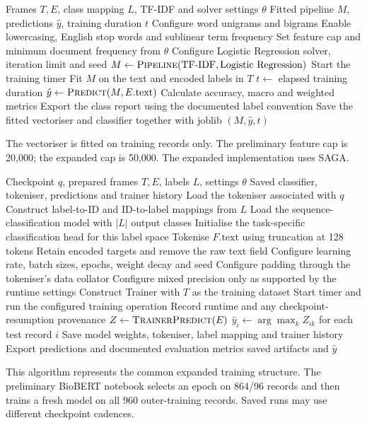 \documentclass[11pt,a4paper]{article}
\begin{document}
\newpage
\begin{algorithm}[H]
\caption{Train and evaluate TF-IDF with Logistic Regression}
\label{alg:tfidf}
\begin{algorithmic}[1]
\Require Frames $T,E$, class mapping $L$, TF-IDF and solver settings $\theta$
\Ensure Fitted pipeline $M$, predictions $\hat y$, training duration $t$
\State Configure word unigrams and bigrams
\State Enable lowercasing, English stop words and sublinear term frequency
\State Set feature cap and minimum document frequency from $\theta$
\State Configure Logistic Regression solver, iteration limit and seed
\State $M\gets\Call{Pipeline}{\text{TF-IDF},\text{Logistic Regression}}$
\State Start the training timer
\State Fit $M$ on the text and encoded labels in $T$
\State $t\gets$ elapsed training duration
\State $\hat y\gets\Call{Predict}{M,E.\text{text}}$
\State Calculate accuracy, macro and weighted metrics
\State Export the class report using the documented label convention
\State Save the fitted vectoriser and classifier together with joblib
\State \Return $(M,\hat y,t)$
\end{algorithmic}
\end{algorithm}
The vectoriser is fitted on training records only. The preliminary feature cap
is 20,000; the expanded cap is 50,000. The expanded implementation uses SAGA.

\newpage
\begin{algorithm}[H]
\caption{Fine-tune an expanded-dataset transformer classifier}
\label{alg:transformer}
\begin{algorithmic}[1]
\Require Checkpoint $q$, prepared frames $T,E$, labels $L$, settings $\theta$
\Ensure Saved classifier, tokeniser, predictions and trainer history
\State Load the tokeniser associated with $q$
\State Construct label-to-ID and ID-to-label mappings from $L$
\State Load the sequence-classification model with $|L|$ output classes
\State Initialise the task-specific classification head for this label space
  \State Tokenise $F.\text{text}$ using truncation at 128 tokens
  \State Retain encoded targets and remove the raw text field
\EndFor
\State Configure learning rate, batch sizes, epochs, weight decay and seed
\State Configure padding through the tokeniser's data collator
\State Configure mixed precision only as supported by the runtime settings
\State Construct Trainer with $T$ as the training dataset
\State Start timer and run the configured training operation
\State Record runtime and any checkpoint-resumption provenance
\State $Z\gets\Call{TrainerPredict}{E}$
\State $\hat y_i\gets\arg\max_k Z_{ik}$ for each test record $i$
\State Save model weights, tokeniser, label mapping and trainer history
\State Export predictions and documented evaluation metrics
\State \Return saved artifacts and $\hat y$
\end{algorithmic}
\end{algorithm}
This algorithm represents the common expanded training structure. The preliminary
BioBERT notebook selects an epoch on 864/96 records and then trains a fresh model
on all 960 outer-training records. Saved runs may use different checkpoint cadences.
\end{document}
